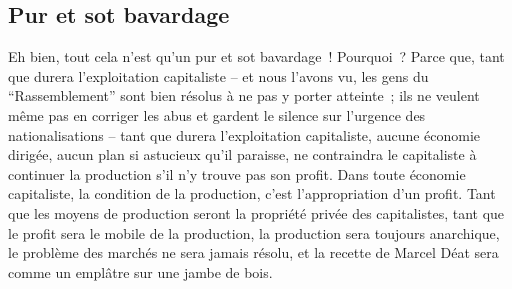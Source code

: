 \documentclass[french,twoside]{book} %
\begin{document}
\subsection[Pur et sot bavardage]{Pur et sot bavardage}
\noindent Eh bien, tout cela n’est qu’un pur et sot bavardage ! Pourquoi ? Parce que, tant que durera l’exploitation capitaliste – et nous l’avons vu, les gens du “Rassemblement” sont bien résolus à ne pas y porter atteinte ; ils ne veulent même pas en corriger les abus et gardent le silence sur l’urgence des nationalisations – tant que durera l’exploitation capitaliste, aucune économie dirigée, aucun plan si astucieux qu’il paraisse, ne contraindra le capitaliste à continuer la production s’il n’y trouve pas son profit. Dans toute économie capitaliste, la condition de la production, c’est l’appropriation d’un profit. Tant que les moyens de production seront la propriété privée des capitalistes, tant que le profit sera le mobile de la production, la production sera toujours anarchique, le problème des marchés ne sera jamais résolu, et la recette de Marcel Déat sera comme un emplâtre sur une jambe de bois.
\end{document}
